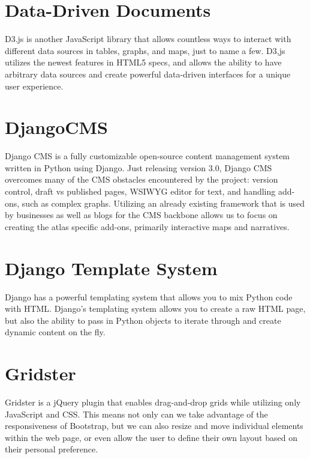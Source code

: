 \documentclass[conference]{IEEEtran}
\begin{document}
\section{Data-Driven Documents~\cite{d3js-2014}}

D3.js is another JavaScript library that allows countless ways to interact with different data sources in tables, graphs, and maps, just to name a few.  D3,js utilizes the newest features in HTML5 specs, and allows the ability to have arbitrary data sources and create powerful data-driven interfaces for a unique user experience.

\section{DjangoCMS~\cite{django-cms-2014}}

Django CMS is a fully customizable open-source content management system written in Python using Django. Just releasing version 3.0, Django CMS overcomes many of the CMS obstacles encountered by the project: version control, draft vs published pages, WSIWYG editor for text, and handling add-ons, such as complex graphs. Utilizing an already existing framework that is used by businesses as well as blogs for the CMS backbone allows us to focus on creating the atlas specific
add-ons, primarily interactive maps and narratives.

\section{Django Template System~\cite{django-template-2014}}

Django has a powerful templating system that allows you to mix Python code with HTML.  Django’s templating system allows you to create a raw HTML page, but also the ability to pass in Python objects to iterate through and create dynamic content on the fly.

\section{Gridster~\cite{gridster-2014}}

Gridster is a jQuery plugin that enables drag-and-drop grids while utilizing only JavaScript and CSS. This means not only can we take advantage of the responsiveness of Bootstrap, but we can also resize and move individual elements within the web page, or even allow the user to define their own layout based on their personal preference.
\end{document}
